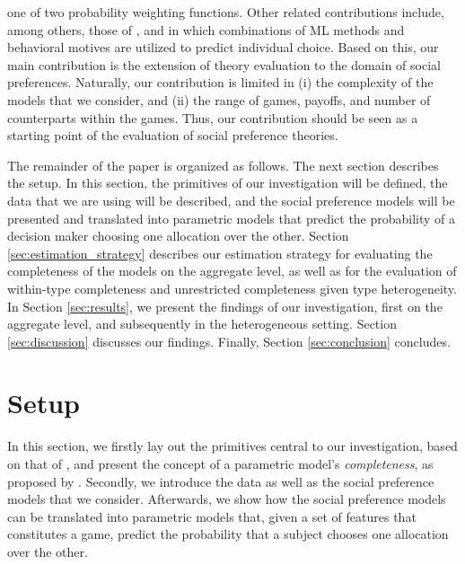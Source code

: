 \documentclass[11pt,a4paper]{article}
\theoremstyle{definition}
\begin{document}
one of two probability weighting functions. Other related contributions include, among others, those of \cite{Noti2016}, \cite{Plonsky2017} and \cite{Plonsky2019} in which combinations of ML methods and behavioral motives are utilized to predict individual choice. Based on this, our main contribution is the extension of theory evaluation to the domain of social preferences. Naturally, our contribution is limited in (i) the complexity of the models that we consider, and (ii) the range of games, payoffs, and number of counterparts within the games. Thus, our contribution should be seen as a starting point of the evaluation of social preference theories.

The remainder of the paper is organized as follows. The next section describes the setup. In this section, the primitives of our investigation will be defined, the data that we are using will be described, and the social preference models will be presented and translated into parametric models that predict the probability of a decision maker choosing one allocation over the other. Section \ref{sec:estimation_strategy} describes our estimation strategy for evaluating the completeness of the models on the aggregate level, as well as for the evaluation of within-type completeness and unrestricted completeness given type heterogeneity. In Section \ref{sec:results}, we present the findings of our investigation, first on the aggregate level, and subsequently in the heterogeneous setting. Section \ref{sec:discussion} discusses our findings. Finally, Section \ref{sec:conclusion} concludes.

\section{Setup}
\label{sec:setup}
In this section, we firstly lay out the primitives central to our investigation, based on that of \citet{Fudenberg2021a}, and present the concept of a parametric model's \emph{completeness},  as proposed by \citet{Fudenberg2021b}. Secondly, we introduce the data as well as the social preference models that we consider. Afterwards, we show how the social preference models can be translated into parametric models that, given a set of features that constitutes a game, predict the probability that a subject chooses one allocation over the other.
\end{document}
